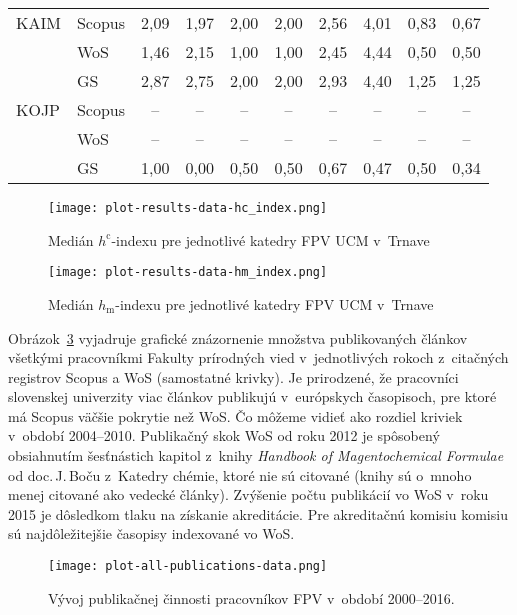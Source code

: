 \begin{table}
\begin{tabularx}{\textwidth}{XXcccc@{\hspace{3ex}}cccc}
 KAIM & Scopus & 2,09     & 1,97 & 2,00  & 2,00 & 2,56     & 4,01 & 0,83 & 0,67 \\
      & WoS    & 1,46     & 2,15 & 1,00  & 1,00 & 2,45     & 4,44 & 0,50 & 0,50 \\
      & GS     & 2,87     & 2,75 & 2,00  & 2,00 & 2,93     & 4,40 & 1,25 & 1,25 \\[3ex]
 KOJP & Scopus & --       & --   & --    & --   & --       & --   & --   & --   \\
      & WoS    & --       & --   & --    & --   & --       & --   & --   & --   \\
      & GS     & 1,00     & 0,00 & 0,50  & 0,50 & 0,67     & 0,47 & 0,50 & 0,34 \\[0.5ex]
  \bottomrule
\end{tabularx}
\end{table}

\begin{figure}
  \centering
  \texttt{[image: plot-results-data-hc\_index.png]}
  \caption{Medián $h^\mathrm{c}$-indexu pre jednotlivé katedry FPV UCM v~Trnave}
  \label{fig:hc-index.plot}
\end{figure}

\begin{figure}
  \centering
  \texttt{[image: plot-results-data-hm\_index.png]}
  \caption{Medián $h_\mathrm{m}$-indexu pre jednotlivé katedry FPV UCM v~Trnave}
  \label{fig:hm-index.plot}
\end{figure}



Obrázok~\ref{fig:all.publications.plot} vyjadruje grafické znázornenie množstva
publikovaných článkov všetkými pracovníkmi Fakulty prírodných vied
v~jednotlivých rokoch z~citačných registrov Scopus a WoS (samostatné krivky).
Je prirodzené, že pracovníci slovenskej univerzity viac článkov publikujú
v~európskych časopisoch, pre ktoré má Scopus väčšie pokrytie než WoS.  Čo môžeme
vidieť ako rozdiel kriviek v~období 2004--2010.  Publikačný skok WoS od roku
2012 je spôsobený obsiahnutím šesťnástich kapitol z~knihy \emph{Handbook of
  Magentochemical Formulae} od doc.\,J.\,Boču z~Katedry chémie, ktoré nie sú
citované (knihy sú o~mnoho menej citované ako vedecké články).  Zvýšenie počtu
publikácií vo WoS v~roku 2015 je dôsledkom tlaku na získanie akreditácie.  Pre
akreditačnú komisiu komisiu sú najdôležitejšie časopisy indexované vo WoS.

\begin{figure}
  \centering
  \texttt{[image: plot-all-publications-data.png]}
  \caption{Vývoj publikačnej činnosti pracovníkov FPV v~období 2000--2016.}
  \label{fig:all.publications.plot}
\end{figure}

